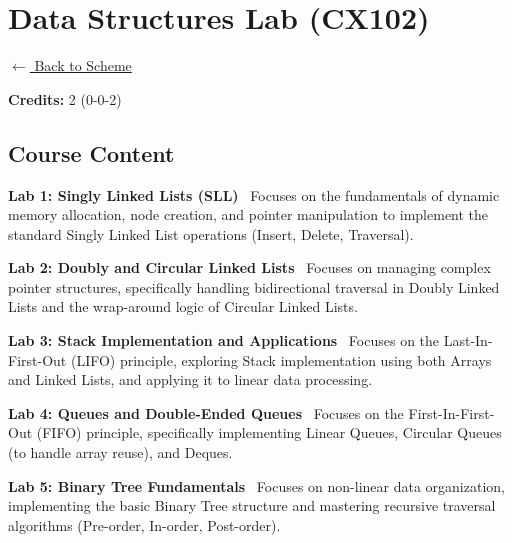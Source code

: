 \section*{Data Structures Lab (CX102)}
\label{course:CX102}

\noindent \small{\hyperref[main:scheme]{$\leftarrow$ Back to Scheme}} \vspace{0.5cm}

\noindent \textbf{Credits:} 2 (0-0-2)

\subsection*{Course Content}
\noindent\textbf{Lab 1: Singly Linked Lists (SLL)} \
Focuses on the fundamentals of dynamic memory allocation, node creation, and pointer manipulation to implement the standard Singly Linked List operations (Insert, Delete, Traversal). \\

\vspace{0.2cm}

\noindent\textbf{Lab 2: Doubly and Circular Linked Lists} \
Focuses on managing complex pointer structures, specifically handling bidirectional traversal in Doubly Linked Lists and the wrap-around logic of Circular Linked Lists. \\

\vspace{0.2cm}

\noindent\textbf{Lab 3: Stack Implementation and Applications} \
Focuses on the Last-In-First-Out (LIFO) principle, exploring Stack implementation using both Arrays and Linked Lists, and applying it to linear data processing. \\

\vspace{0.2cm}

\noindent\textbf{Lab 4: Queues and Double-Ended Queues} \
Focuses on the First-In-First-Out (FIFO) principle, specifically implementing Linear Queues, Circular Queues (to handle array reuse), and Deques. \\

\vspace{0.2cm}

\noindent\textbf{Lab 5: Binary Tree Fundamentals} \
Focuses on non-linear data organization, implementing the basic Binary Tree structure and mastering recursive traversal algorithms (Pre-order, In-order, Post-order). \\

